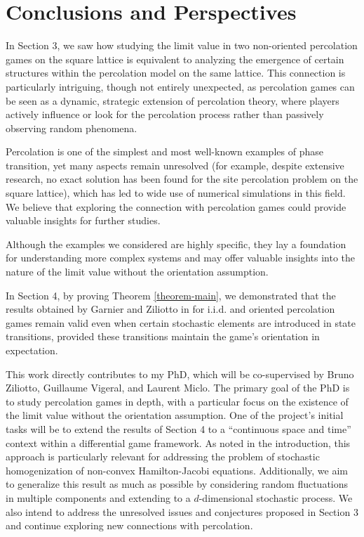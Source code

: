 \section{Conclusions and Perspectives}
In Section 3, we saw how studying the limit value in two non-oriented percolation games on the square lattice is equivalent to analyzing the emergence of certain structures within the percolation model on the same lattice. This connection is particularly intriguing, though not entirely unexpected, as percolation games can be seen as a dynamic, strategic extension of percolation theory, where players actively influence or look for the percolation process rather than passively observing random phenomena.

Percolation is one of the simplest and most well-known examples of phase transition, yet many aspects remain unresolved (for example, despite extensive research, no exact solution has been found for the site percolation problem on the square lattice), which has led to wide use of numerical simulations in this field. We believe that exploring the connection with percolation games could provide valuable insights for further studies.

Although the examples we considered are highly specific, they lay a foundation for understanding more complex systems and may offer valuable insights into the nature of the limit value without the orientation assumption.

In Section 4, by proving Theorem \ref{theorem-main}, we demonstrated that the results obtained by Garnier and Ziliotto in \cite{GarnierZiliotto2022} for i.i.d. and oriented percolation games remain valid even when certain stochastic elements are introduced in state transitions, provided these transitions maintain the game's orientation in expectation. 

This work directly contributes to my PhD, which will be co-supervised by Bruno Ziliotto, Guillaume Vigeral, and Laurent Miclo. The primary goal of the PhD is to study percolation games in depth, with a particular focus on the existence of the limit value without the orientation assumption. One of the project's initial tasks will be to extend the results of Section 4 to a ``continuous space and time'' context within a differential game framework. As noted in the introduction, this approach is particularly relevant for addressing the problem of stochastic homogenization of non-convex Hamilton-Jacobi equations. Additionally, we aim to generalize this result as much as possible by considering random fluctuations in multiple components and extending to a $d$-dimensional stochastic process. We also intend to address the unresolved issues and conjectures proposed in Section 3 and continue exploring new connections with percolation.

